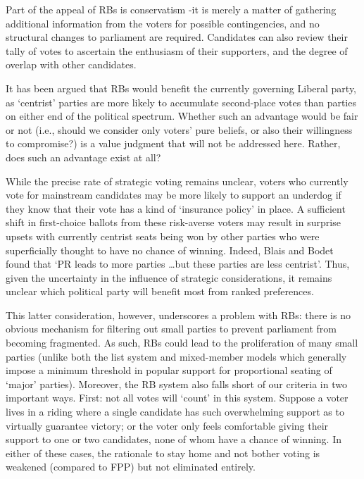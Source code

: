 Part of the appeal of RBs is conservatism \--it is merely a matter of gathering additional information from the voters for possible contingencies, and no structural changes to parliament are required. Candidates can also review their tally of votes to ascertain the enthusiasm of their supporters, and the degree of overlap with other candidates.

It has been argued\cite{Record} that RBs would benefit the currently governing Liberal party, as `centrist' parties are more likely to accumulate second-place votes than parties on either end of the political spectrum.
Whether such an advantage would be fair or not (i.e., should we consider only voters' pure beliefs, or also their willingness to compromise?) is a value judgment that will not be addressed here. Rather, does such an advantage exist at all?

While the precise rate of strategic voting remains unclear, voters who currently vote for mainstream candidates may be more likely to support an underdog if they know that their vote has a kind of `insurance policy' in place.
A sufficient shift in first-choice ballots from these risk-averse voters may result in surprise upsets with currently centrist seats being won by other parties who were superficially thought to have no chance of winning. Indeed, Blais and Bodet found that `PR  leads to more parties \ldots but these parties are less centrist'\cite{Blais_2006}.
Thus, given the uncertainty in the influence of strategic considerations, it remains  unclear which political party will benefit most from ranked preferences.

This latter consideration, however, underscores a problem with RBs:  there is no obvious mechanism for filtering out small parties to prevent parliament from becoming fragmented. As such, RBs could lead to the proliferation of many small parties
(unlike both the list system and  mixed-member models which generally impose a minimum threshold in popular support for proportional seating of `major' parties).
Moreover, the RB system also falls short of our criteria in two important ways.
First: not all votes will `count' in this system.
Suppose a voter lives in a riding where a single candidate has such overwhelming support as to virtually guarantee victory; or the voter only feels comfortable giving their support to one or two candidates, none of whom have a chance of winning.
In either of these cases, the rationale to stay home and not bother voting is weakened (compared to FPP) but not eliminated entirely.

